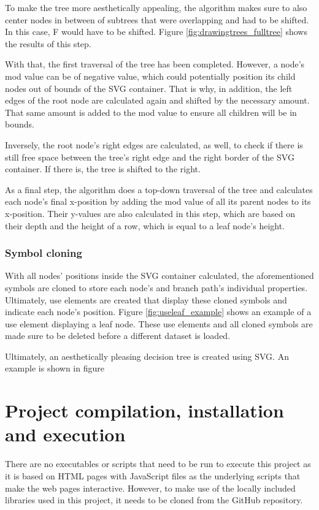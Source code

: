 To make the tree more aesthetically appealing, the algorithm makes sure to also center nodes in between of subtrees that were overlapping and had to be shifted. In this case, F would have to be shifted. Figure \ref{fig:drawingtrees_fulltree} shows the results of this step.

With that, the first traversal of the tree has been completed. However, a node's mod value can be of negative value, which could potentially position its child nodes out of bounds of the SVG container. That is why, in addition, the left edges of the root node are calculated again and shifted by the necessary amount. That same amount is added to the mod value to ensure all children will be in bounds.

Inversely, the root node's right edges are calculated, as well, to check if there is still free space between the tree's right edge and the right border of the SVG container. If there is, the tree is shifted to the right.

As a final step, the algorithm does a top-down traversal of the tree and calculates each node's final x-position by adding the mod value of all its parent nodes to its x-position. Their y-values are also calculated in this step, which are based on their depth and the height of a row, which is equal to a leaf node's height. 

\subsubsection{Symbol cloning}
With all nodes' positions inside the SVG container calculated, the aforementioned symbols are cloned to store each node's and branch path's individual properties. Ultimately, use elements are created that display these cloned symbols and indicate each node's position. Figure \ref{fig:useleaf_example} shows an example of a use element displaying a leaf node.
These use elements and all cloned symbols are made sure to be deleted before a different dataset is loaded.

Ultimately, an aesthetically pleasing decision tree is created using SVG. An example is shown in figure

\section{Project compilation, installation and execution}
There are no executables or scripts that need to be run to execute this project as it is based on HTML pages with JavaScript files as the underlying scripts that make the web pages interactive. However, to make use of the locally included libraries used in this project, it needs to be cloned from the GitHub repository.

